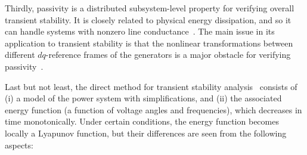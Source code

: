 Thirdly, passivity is a distributed subsystem-level property for verifying overall transient stability. It is closely related to physical energy dissipation, and so it can handle systems with nonzero line conductance~\cite{spanias2018system,siahaan2024decentralized}. The main issue in its application to transient stability is that the nonlinear transformations between different $dq$-reference frames of the generators is a major obstacle for verifying passivity~\cite{caliskan2014compositional}.

Last but not least, the direct method for transient stability analysis~\cite{varaiya1985direct,chiang1987foundations,rimorov2018approach,cheng2021transient} consists of (i) a model of the power system with simplifications, and (ii) the associated energy function (a function of voltage angles and frequencies), which decreases in time monotonically. Under certain conditions, the energy function becomes locally a Lyapunov function, but their differences are seen from the following aspects:
